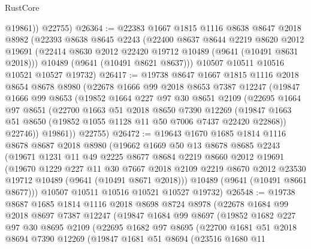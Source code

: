 \begin{lexlean}{RustCore}
\begin{coremodule}
          @19861))
      @22755)
@26364 := @22383
    @1667
    @1815
    @1116
    @8638
    @8647
    @2018
    @8982
    (@22393
      @8638
      @8645
      @2243
      (@22400
        @8637
        @8644
        @2219
        @8620
        @2012
        @19691
        (@22414 @8630 @2012 @22420 @19712 @10489 (@9641 (@10491 @8631 @2018)))
        @10489
        (@9641 (@10491 @8621 @8637)))
      @10507
      @10511
      @10516
      @10521
      @10527
      @19732)
@26417 := @19738
    @8647
    @1667
    @1815
    @1116
    @2018
    @8654
    @8678
    @8980
    (@22678
      @1666
      @99
      @2018
      @8653
      @7387
      @12247
      (@19847
        @1666
        @99
        @8653
        (@19852
          @1664
          @227
          @97
          @30
          @8651
          @2109
          (@22695
            @1664
            @97
            @8651
            (@22700
              @1663
              @51
              @2018
              @8650
              @7390
              @12269
              (@19847 @1663 @51 @8650 (@19852 @1055 @1128 @11 @50 @7006 @7437 @22420 @22868))
              @22746))
          @19861))
      @22755)
@26472 := @19643
    @1670
    @1685
    @1814
    @1116
    @8678
    @8687
    @2018
    @8980
    (@19662
      @1669
      @50
      @13
      @8678
      @8685
      @2243
      (@19671
        @1231
        @11
        @49
        @2225
        @8677
        @8684
        @2219
        @8660
        @2012
        @19691
        (@19670
          @1229
          @227
          @11
          @30
          @7667
          @2018
          @2109
          @2219
          @8670
          @2012
          @23530
          @19712
          @10489
          (@9641 (@10491 @8671 @2018)))
        @10489
        (@9641 (@10491 @8661 @8677)))
      @10507
      @10511
      @10516
      @10521
      @10527
      @19732)
@26548 := @19738
    @8687
    @1685
    @1814
    @1116
    @2018
    @8698
    @8724
    @8978
    (@22678
      @1684
      @99
      @2018
      @8697
      @7387
      @12247
      (@19847
        @1684
        @99
        @8697
        (@19852
          @1682
          @227
          @97
          @30
          @8695
          @2109
          (@22695
            @1682
            @97
            @8695
            (@22700
              @1681
              @51
              @2018
              @8694
              @7390
              @12269
              (@19847
                @1681
                @51
                @8694
                (@23516
                  @1680
                  @11

\end{coremodule}
\end{lexlean}
